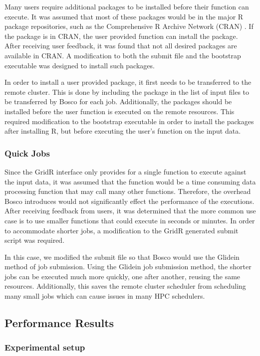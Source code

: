\documentclass[conference]{IEEEtran}
\begin{document}
Many users require additional packages to be installed before their function can execute.  It was assumed that most of these packages would be in the major R package repositories, such as the Comprehensive R Archive Network (CRAN) \cite{cran}.  If the package is in CRAN, the user provided function can install the package.  After receiving user feedback, it was found that not all desired packages are available in CRAN.  A modification to both the submit file and the bootstrap executable was designed to install such packages.

In order to install a user provided package, it first needs to be transferred to the remote cluster.  This is done by including the package in the list of input files to be transferred by Bosco for each job.  Additionally, the packages should be installed before the user function is executed on the remote resources.  This required modification to the bootstrap executable in order to install the packages after installing R, but before executing the user's function on the input data.

\subsubsection{Quick Jobs}
Since the GridR interface only provides for a single function to execute against the input data, it was assumed that the function would be a time consuming data processing function that may call many other functions.  Therefore, the overhead Bosco introduces would not significantly effect the performance of the executions.  After receiving feedback from users, it was determined that the more common use case is to use smaller functions that could execute in seconds or minutes.  In order to accommodate shorter jobs, a modification to the GridR generated submit script was required.

In this case, we modified the submit file so that Bosco would use the Glidein method of job submission.  Using the Glidein job submission method, the shorter jobs can be executed much more quickly, one after another, reusing the same resources.  Additionally, this saves the remote cluster scheduler from scheduling many small jobs which can cause issues in many HPC schedulers.


\subsection{Performance Results}

\subsubsection{Experimental setup}  
\end{document}
